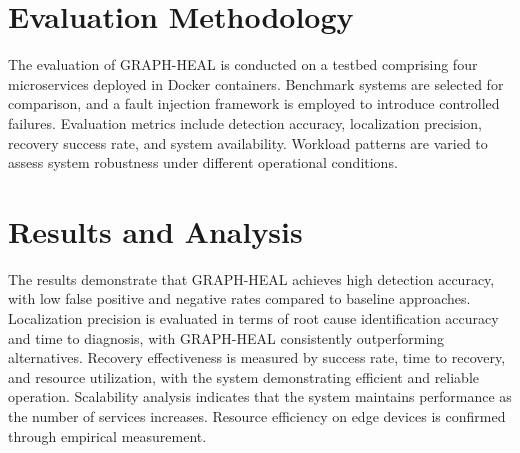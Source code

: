 \documentclass[11pt,twocolumn]{article}
\begin{document}

\section{Evaluation Methodology}
The evaluation of GRAPH-HEAL is conducted on a testbed comprising four microservices deployed in Docker containers. Benchmark systems are selected for comparison, and a fault injection framework is employed to introduce controlled failures. Evaluation metrics include detection accuracy, localization precision, recovery success rate, and system availability. Workload patterns are varied to assess system robustness under different operational conditions.

\section{Results and Analysis}
The results demonstrate that GRAPH-HEAL achieves high detection accuracy, with low false positive and negative rates compared to baseline approaches. Localization precision is evaluated in terms of root cause identification accuracy and time to diagnosis, with GRAPH-HEAL consistently outperforming alternatives. Recovery effectiveness is measured by success rate, time to recovery, and resource utilization, with the system demonstrating efficient and reliable operation. Scalability analysis indicates that the system maintains performance as the number of services increases. Resource efficiency on edge devices is confirmed through empirical measurement. 
\end{document}

